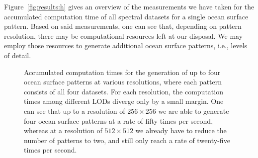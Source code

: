 %
%
Figure~\ref{fig:results:h} gives an overview of the measurements we have taken
for the accumulated computation time of all spectral datasets for a single
ocean surface pattern. Based on said measurements, one can see that, depending
on pattern resolution, there may be computational resources left at our
disposal.
We may employ those resources to generate additional ocean surface patterns,
i.e., levels of detail.
%
\begin{figure}
\centering
\mydata
{}
\caption[Accumulated computation times for the generation of up to four
ocean surface patterns at various resolutions, where each pattern consists of
all four datasets.]{
Accumulated computation times for the generation of up to four
ocean surface patterns at various resolutions, where each pattern consists of
all four datasets.
For each resolution, the computation times among different LODs diverge only
by a small margin.
One can see that up to a resolution of $256 \times 256$ we are able to generate
four ocean surface patterns at a rate of fifty times per second, whereas at a
resolution of $512 \times 512$ we already have to reduce the number of patterns
to two, and still only reach a rate of twenty-five times per second.}
\label{fig:results:lods}
\end{figure}
